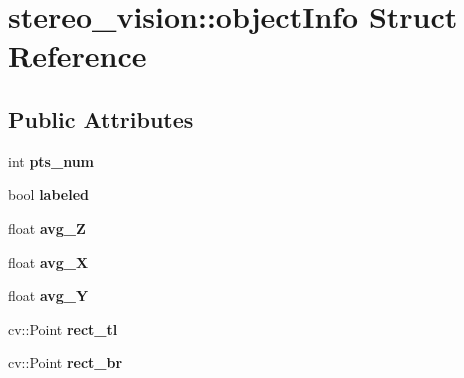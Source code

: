 \hypertarget{structstereo__vision_1_1object_info}{}\section{stereo\+\_\+vision\+:\+:object\+Info Struct Reference}
\label{structstereo__vision_1_1object_info}
\subsection*{Public Attributes}
\begin{DoxyCompactItemize}
\item 
\hypertarget{structstereo__vision_1_1object_info_a86477a8593132539bd62a97dcefd8222}{}int {\bfseries pts\+\_\+num}\label{structstereo__vision_1_1object_info_a86477a8593132539bd62a97dcefd8222}

\item 
\hypertarget{structstereo__vision_1_1object_info_ad508298c68abd33e4dac728d447d0ba4}{}bool {\bfseries labeled}\label{structstereo__vision_1_1object_info_ad508298c68abd33e4dac728d447d0ba4}

\item 
\hypertarget{structstereo__vision_1_1object_info_ad0907414a1af2544d9d7949481bf70c5}{}float {\bfseries avg\+\_\+\+Z}\label{structstereo__vision_1_1object_info_ad0907414a1af2544d9d7949481bf70c5}

\item 
\hypertarget{structstereo__vision_1_1object_info_a29a79b6657553d64b5a31d88508fe9aa}{}float {\bfseries avg\+\_\+\+X}\label{structstereo__vision_1_1object_info_a29a79b6657553d64b5a31d88508fe9aa}

\item 
\hypertarget{structstereo__vision_1_1object_info_a5fd0b0149e40b8d7cdab51f67fdf4c18}{}float {\bfseries avg\+\_\+\+Y}\label{structstereo__vision_1_1object_info_a5fd0b0149e40b8d7cdab51f67fdf4c18}

\item 
\hypertarget{structstereo__vision_1_1object_info_a8b4a88c1db9929bf9b9befa081e99c98}{}cv\+::\+Point {\bfseries rect\+\_\+tl}\label{structstereo__vision_1_1object_info_a8b4a88c1db9929bf9b9befa081e99c98}

\item 
\hypertarget{structstereo__vision_1_1object_info_ac38fdc320a13a6390b5ecdb490771689}{}cv\+::\+Point {\bfseries rect\+\_\+br}\label{structstereo__vision_1_1object_info_ac38fdc320a13a6390b5ecdb490771689}


\end{DoxyCompactItemize}
